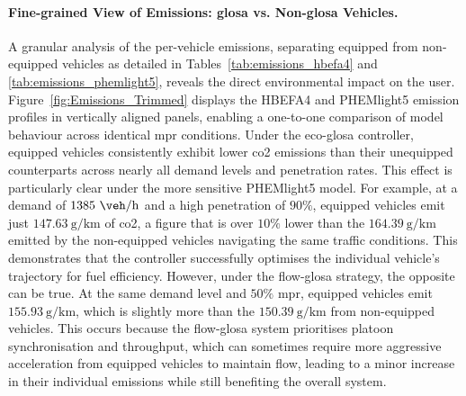 \paragraph{Fine-grained View of Emissions: \ac{glosa} vs. Non-\ac{glosa} Vehicles.}
A granular analysis of the per-vehicle emissions, separating equipped from non-equipped vehicles as detailed in Tables~\vref{tab:emissions_hbefa4} and \vref{tab:emissions_phemlight5}, reveals the direct environmental impact on the user. Figure~\vref{fig:Emissions_Trimmed} displays the HBEFA4 and PHEMlight5 emission profiles in vertically aligned panels, enabling a one-to-one comparison of model behaviour across identical \ac{mpr} conditions. Under the \ac{eco-glosa} controller, equipped vehicles consistently exhibit lower \ac{co2} emissions than their unequipped counterparts across nearly all demand levels and penetration rates. This effect is particularly clear under the more sensitive PHEMlight5 model. For example, at a demand of $1385~\unit{\veh\per\hour}$ and a high penetration of $90\%$, equipped vehicles emit just $147.63~\unit{\gram\per\kilo\metre}$ of \ac{co2}, a figure that is over $10\%$ lower than the $164.39~\unit{\gram\per\kilo\metre}$ emitted by the non-equipped vehicles navigating the same traffic conditions. This demonstrates that the controller successfully optimises the individual vehicle's trajectory for fuel efficiency. However, under the \ac{flow-glosa} strategy, the opposite can be true. At the same demand level and $50\%$ \ac{mpr}, equipped vehicles emit $155.93~\unit{\gram\per\kilo\metre}$, which is slightly more than the $150.39~\unit{\gram\per\kilo\metre}$ from non-equipped vehicles. This occurs because the \ac{flow-glosa} system prioritises platoon synchronisation and throughput, which can sometimes require more aggressive acceleration from equipped vehicles to maintain flow, leading to a minor increase in their individual emissions while still benefiting the overall system.

